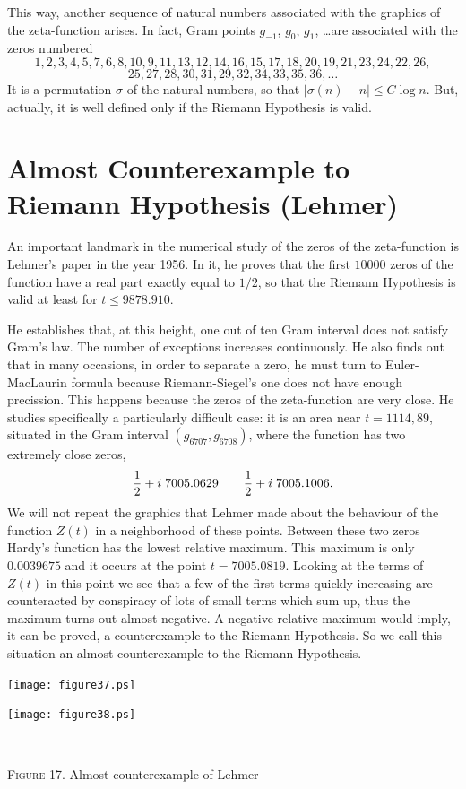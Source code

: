 \documentclass[a4paper]{amsart}
\numberwithin{equation}{section}
\begin{document}
\begin{large}
This way, another sequence of natural numbers associated with the graphics of
the zeta-function arises. In fact, Gram points $g_{-1}$, $g_0$, 
$g_1$, \dots are
associated with the zeros numbered
$$1, 2, 3, 4, 5, 7, 6, 8, 10, 9, 11, 13, 12, 14, 16, 15, 17, 18, 
20,19,21, 23, 24, 22, 26,$$
$$25, 27, 28, 30, 31, 29, 32, 34, 33, 35, 
36, \dots$$
It is a permutation $\sigma$ of the natural numbers, so that $|\sigma(n) -
n|\le C\log n$. But, actually, it is well defined only if the Riemann
Hypothesis is valid.


\section{Almost Counterexample to Riemann Hypothesis (Lehmer)}

An important landmark in the numerical study of the zeros of the zeta-function
is Lehmer's paper \cite{Le} in the year 1956. In it, he proves that the first
$10000$ zeros of the function have a real part exactly equal to $1/2$, so that
the Riemann Hypothesis is valid at least for $t\leq 9878.910$.


He establishes that, at this height, one out of ten Gram interval does not
satisfy Gram's law. The number of exceptions increases continuously. He also
finds out that in many occasions, in order to separate a zero, he must turn to
Euler-MacLaurin formula because Riemann-Siegel's one does not have enough
precission. This happens because  the zeros of the
zeta-function are very close. He studies specifically a particularly difficult
case: it is an area near $t=1114,89$, situated in the Gram interval $(g_{6707},
g_{6708})$, where the function has two extremely close zeros,
$${1\over2}+i\; 7005.0629\qquad {1\over2}+i\; 7005.1006.$$
We will not repeat the graphics that Lehmer made about the behaviour of the
function $Z(t)$ in a neighborhood of these points. Between these two zeros 
Hardy's function has the lowest relative maximum. This maximum is
only $0.0039675$ and it occurs at the point $t=7005.0819$. Looking at the
terms of $Z(t)$ in this point we see that a few of the first terms quickly
increasing are counteracted by conspiracy of lots of small terms which sum up,
thus the maximum turns out almost negative. A negative relative maximum would
imply, it can be proved, a counterexample to the Riemann Hypothesis. So we call
this situation an almost counterexample to the Riemann Hypothesis.



\vfil\eject




\end{large}
\begin{minipage}{330pt}
\begin{minipage}{154.5pt} 
\texttt{[image: figure37.ps]}
\end{minipage}
\hfil
\begin{minipage}{154.5pt}
\texttt{[image: figure38.ps]}
\end{minipage}
\centerline{\ }
\centerline{ {\scshape Figure} 17. Almost counterexample of Lehmer}
\end{minipage}
\end{document}
